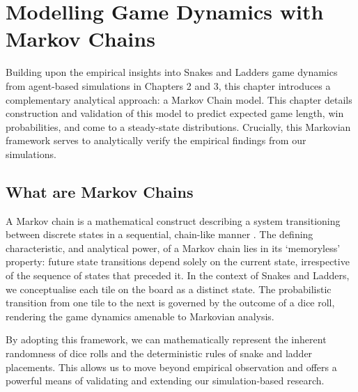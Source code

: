 \chapter{Modelling Game Dynamics with Markov Chains}
Building upon the empirical insights into Snakes and Ladders game dynamics from agent-based simulations in Chapters 2 and 3, this chapter introduces a complementary analytical approach: a Markov Chain model. This chapter details construction and validation of this model to predict expected game length, win probabilities, and come to a steady-state distributions. Crucially, this Markovian framework serves to analytically verify the empirical findings from our simulations.

\section{What are Markov Chains}
A Markov chain is a mathematical construct describing a system transitioning between discrete states in a sequential, chain-like manner \autocites{dusautoyWorldEightyGames2024}. The defining characteristic, and analytical power, of a Markov chain lies in its ‘memoryless’ property: future state transitions depend solely on the current state, irrespective of the sequence of states that preceded it. In the context of Snakes and Ladders, we conceptualise each tile on the board as a distinct state. The probabilistic transition from one tile to the next is governed by the outcome of a dice roll, rendering the game dynamics amenable to Markovian analysis.

By adopting this framework, we can mathematically represent the inherent randomness of dice rolls and the deterministic rules of snake and ladder placements. This allows us to move beyond empirical observation and offers a powerful means of validating and extending our simulation-based research.

